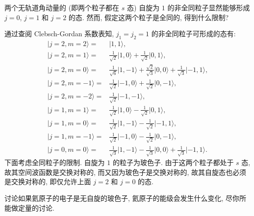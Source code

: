 \documentclass{assignment}
\begin{document}
\begin{prob}[课本习题 7.3]
    两个无轨道角动量的 (即两个粒子都在 $s$ 态) 自旋为 $1$ 的非全同粒子显然能够形成 $j=0$, $j=1$ 和 $j=2$ 的态. 然而, 假定这两个粒子是全同的, 得到什么限制?
\end{prob}
\begin{pf}
    通过查阅 Clebsch-Gordan 系数表知, $j_1=j_2=1$ 的非全同粒子可形成的态有:
    \begin{align}
        \lvert j=2,m=2\rangle=&\lvert 1,1\rangle,\\
        \lvert j=2,m=1\rangle=&\frac{1}{\sqrt{2}}\lvert 1,0\rangle+\frac{1}{\sqrt{2}}\lvert 0,1\rangle,\\
        \lvert j=2,m=0\rangle=&\frac{1}{\sqrt{6}}\lvert 1,-1\rangle+\frac{\sqrt{2}}{\sqrt{3}}\lvert 0,0\rangle+\frac{1}{\sqrt{3}}\lvert-1,1\rangle,\\
        \lvert j=2,m=-1\rangle=&\frac{1}{\sqrt{2}}\lvert-1,0\rangle+\frac{1}{\sqrt{2}}\lvert 0,-1\rangle,\\
        \lvert j=2,m=-2\rangle=&\frac{1}{\sqrt{2}}\lvert-1,-1\rangle,\\
        \lvert j=1,m=1\rangle=&\frac{1}{\sqrt{2}}\lvert 1,0\rangle-\frac{1}{\sqrt{2}}\lvert 0,1\rangle,\\
        \lvert j=1,m=0\rangle=&\frac{1}{\sqrt{2}}\lvert 1,-1\rangle-\frac{1}{\sqrt{2}}\lvert -1,1\rangle,\\
        \lvert j=1,m=-1\rangle=&\frac{1}{\sqrt{2}}\lvert-1,0\rangle-\frac{1}{\sqrt{2}}\lvert 0,-1\rangle,\\
        \lvert j=0,m=0\rangle=&\frac{1}{\sqrt{3}}\lvert 1,-1\rangle-\frac{1}{\sqrt{3}}\lvert 0,0\rangle+\frac{1}{\sqrt{3}}\lvert-1,1\rangle.
    \end{align}
    下面考虑全同粒子的限制. 自旋为 $1$ 的粒子为玻色子. 由于这两个粒子都处于 $s$ 态, 故其空间波函数是交换对称的, 而又因为玻色子是交换对称的, 故其自旋态也必须是交换对称的, 即仅允许上面 $j=2$ 和 $j=0$ 的态.
\end{pf}

\begin{prob}[课本习题 7.4]
    讨论如果氦原子的电子是无自旋的玻色子, 氦原子的能级会发生什么变化, 尽你所能做定量的讨论.
\end{prob}
\begin{sol}
    
\end{sol}
\end{document}
